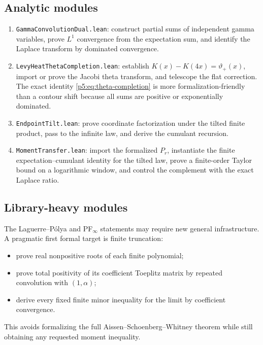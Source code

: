 \documentclass[11pt]{article}
\numberwithin{equation}{section}
\theoremstyle{definition}
\theoremstyle{remark}
\begin{document}
\subsection{Analytic modules}

\begin{enumerate}
\item \texttt{GammaConvolutionDual.lean}: construct partial sums of independent
      gamma variables, prove $L^1$ convergence from the expectation sum, and
      identify the Laplace transform by dominated convergence.
\item \texttt{LevyHeatThetaCompletion.lean}: establish
      $K(x)-K(4x)=\vartheta_+(x)$, import or prove the Jacobi theta transform,
      and telescope the flat correction.  The exact identity
      \cref{p5:eq:theta-completion} is more formalization-friendly than a contour
      shift because all sums are positive or exponentially dominated.
\item \texttt{EndpointTilt.lean}: prove coordinate factorization under the
      tilted finite product, pass to the infinite law, and derive the cumulant
      recursion.
\item \texttt{MomentTransfer.lean}: import the formalized \(P_r\), instantiate
      the finite expectation--cumulant identity for the tilted law, prove a
      finite-order Taylor bound on a logarithmic window, and control the
      complement with the exact Laplace ratio.
\end{enumerate}

\subsection{Library-heavy modules}

The Laguerre--P\'olya and PF$_\infty$ statements may require new general
infrastructure.  A pragmatic first formal target is finite truncation:
\begin{itemize}
\item prove real nonpositive roots of each finite polynomial;
\item prove total positivity of its coefficient Toeplitz matrix by repeated
      convolution with $(1,\alpha)$;
\item derive every fixed finite minor inequality for the limit by coefficient
      convergence.
\end{itemize}
This avoids formalizing the full Aissen--Schoenberg--Whitney theorem while
still obtaining any requested moment inequality.
\end{document}
